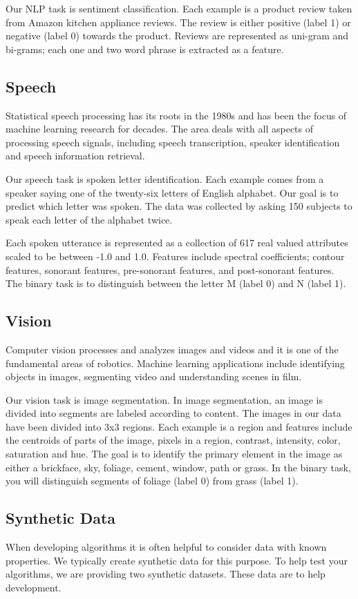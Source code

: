 \documentclass[11pt]{article}
\begin{document}
Our NLP task is sentiment classification. Each example is a product review taken from Amazon kitchen appliance reviews. The review is either positive (label 1) or negative (label 0) towards the product. Reviews are represented as uni-gram and bi-grams; each one and two word phrase is extracted as a feature.

\subsection{Speech}
Statistical speech processing has its roots in the 1980s and has been the focus of machine learning research for decades. The area deals with all aspects of processing speech signals, including speech transcription, speaker identification and speech information retrieval.

Our speech task is spoken letter identification. Each example comes from a speaker saying one of the twenty-six letters of English alphabet. Our goal is to predict which letter was spoken. The data was collected by asking 150 subjects to speak each letter of the alphabet twice.

Each spoken utterance is represented as a collection of 617 real valued attributes scaled to be between -1.0 and 1.0. Features include spectral coefficients; contour features, sonorant features, pre-sonorant features, and post-sonorant features. The binary task is to distinguish between the letter M (label 0) and N (label 1).

\subsection{Vision}
Computer vision processes and analyzes images and videos and it is one of the fundamental areas of robotics. Machine learning applications include identifying objects in images, segmenting video and understanding scenes in film.

Our vision task is image segmentation. In image segmentation, an image is divided into segments are labeled according to content. The images in our data have been divided into 3x3 regions. Each example is a region and features include the centroids of parts of the image, pixels in a region, contrast, intensity, color, saturation and hue. The goal is to identify the primary element in the image as either a brickface, sky, foliage, cement, window, path or grass. In the binary task, you will distinguish segments of foliage (label 0) from grass (label 1).

\subsection{Synthetic Data}
When developing algorithms it is often helpful to consider data with known properties. We typically create synthetic data for this purpose. To help test your algorithms, we are providing two synthetic datasets. These data are to help development.
\end{document}
